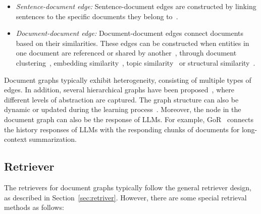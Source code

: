 \begin{itemize}[leftmargin=*]
\begin{itemize}
    \item {\it Sentence-document edge:} Sentence-document edges are constructed by linking sentences to the specific documents they belong to~\citep{thayaparan2019identifying}.

    \item {\it Document-document edge:} Document-document edges connect documents based on their similarities. These edges can be constructed when entities in one document are referenced or shared by another~\citep{thayaparan2019identifying, dong2024don}, through document clustering~\citep{wang2023docgraphlm}, embedding similarity~\citep{li2020leveraging}, topic similarity~\citep{zhang2024coarse} or structural similarity~\citep{liu2023modeling}.
\end{itemize}
\end{itemize}

Document graphs typically exhibit heterogeneity, consisting of multiple types of edges. In addition, several hierarchical graphs have been proposed~\citep{weninger2012document, zhang2024teleclass}, where different levels of abstraction are captured. The graph structure can also be dynamic or updated during the learning process~\citep{wang2020heterogeneous, nan2020reasoning, wang2023docgraphlm, liu2022hierarchical}. Moreover, the node in the document graph can also be the response of LLMs. For example, GoR~\citep{zhang2024graph} connects the history responses of LLMs with the responding chunks of documents for long-context summarization.




\subsection{Retriever}

The retrievers for document graphs typically follow the general retriever design, as described in Section~\ref{sec:retriver}. However, there are some special retrieval methods as follows:


